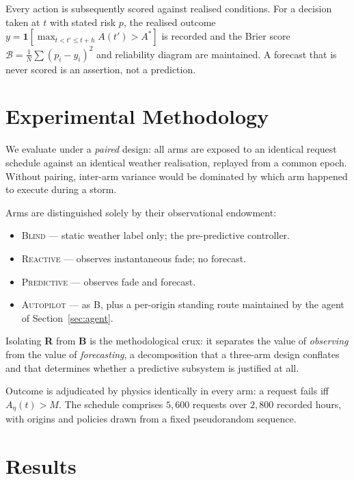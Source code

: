 \documentclass[10pt,twocolumn]{article}
\newcommand{\Ind}[1]{\mathbf{1}\!\left[#1\right]}
\begin{document}
Every action is subsequently scored against realised conditions. For a decision
taken at $t$ with stated risk $p$, the realised outcome
$y=\Ind{\max_{t<t'\le t+h}A(t')>A^{\ast}}$ is recorded and the Brier score
$\mathcal{B}=\frac{1}{N}\sum(p_i-y_i)^{2}$ and reliability diagram are
maintained. A forecast that is never scored is an assertion, not a prediction.

\section{Experimental Methodology}
\label{sec:method}

We evaluate under a \emph{paired} design: all arms are exposed to an identical
request schedule against an identical weather realisation, replayed from a
common epoch. Without pairing, inter-arm variance would be dominated by which
arm happened to execute during a storm.

Arms are distinguished solely by their observational endowment:
\begin{itemize}
\item[\textbf{A}] \textsc{Blind} --- static weather label only; the
pre-predictive controller.
\item[\textbf{R}] \textsc{Reactive} --- observes instantaneous fade; no forecast.
\item[\textbf{B}] \textsc{Predictive} --- observes fade and forecast.
\item[\textbf{C}] \textsc{Autopilot} --- as B, plus a per-origin standing route
maintained by the agent of Section~\ref{sec:agent}.
\end{itemize}

Isolating \textbf{R} from \textbf{B} is the methodological crux: it separates the
value of \emph{observing} from the value of \emph{forecasting}, a decomposition
that a three-arm design conflates and that determines whether a predictive
subsystem is justified at all.

Outcome is adjudicated by physics identically in every arm: a request fails iff
$A_{\eta}(t)>M$. The schedule comprises $5{,}600$ requests over $2{,}800$
recorded hours, with origins and policies drawn from a fixed pseudorandom
sequence.

\section{Results}
\label{sec:results}
\end{document}

